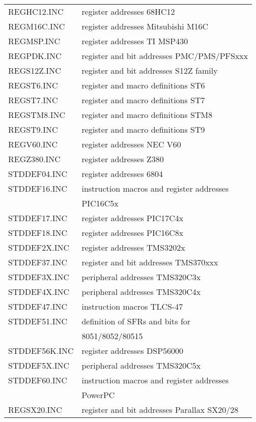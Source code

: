 \documentclass[12pt,twoside]{report}
\begin{document}
\begin{center}
\begin{longtable}{|l|l|}
REGHC12.INC       & register addresses 68HC12 \\
REGM16C.INC       & register addresses Mitsubishi M16C \\
REGMSP.INC        & register addresses TI MSP430 \\
REGPDK.INC        & register and bit addresses PMC/PMS/PFSxxx \\
REGS12Z.INC       & register and bit addresses S12Z family \\
REGST6.INC        & register and macro definitions ST6 \\
REGST7.INC        & register and macro definitions ST7 \\
REGSTM8.INC       & register and macro definitions STM8 \\
REGST9.INC        & register and macro definitions ST9 \\
REGV60.INC        & register addresses NEC V60 \\
REGZ380.INC       & register addresses Z380 \\
STDDEF04.INC      & register addresses 6804 \\
STDDEF16.INC      & instruction macros and register addresses \\
                  & PIC16C5x \\
STDDEF17.INC      & register addresses PIC17C4x \\
STDDEF18.INC      & register addresses PIC16C8x \\
STDDEF2X.INC      & register addresses TMS3202x \\
STDDEF37.INC      & register and bit addresses TMS370xxx \\
STDDEF3X.INC      & peripheral addresses TMS320C3x \\
STDDEF4X.INC      & peripheral addresses TMS320C4x \\
STDDEF47.INC      & instruction macros TLCS-47 \\
STDDEF51.INC      & definition of SFRs and bits for \\
                  & 8051/8052/80515 \\
STDDEF56K.INC     & register addresses DSP56000 \\
STDDEF5X.INC      & peripheral addresses TMS320C5x \\
STDDEF60.INC      & instruction macros and register addresses \\
                  & PowerPC \\
REGSX20.INC       & register and bit addresses Parallax SX20/28 \\

\end{longtable}
\end{center}
\end{document}
